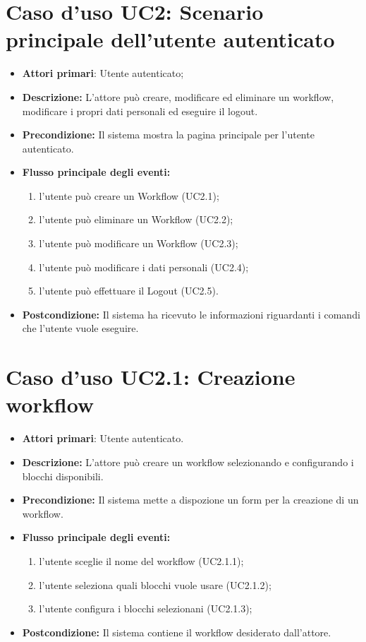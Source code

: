 {{{\section{Caso d'uso UC2: Scenario principale dell'utente autenticato}
\begin{itemize}
	\item \textbf{Attori primari}: Utente autenticato;
	\item \textbf{Descrizione:} L'attore può creare, modificare ed eliminare un workflow, modificare i propri dati personali ed eseguire il logout.
	\item \textbf{Precondizione:} Il sistema mostra la pagina principale per l'utente autenticato.
	\item \textbf{Flusso principale degli eventi:}
	\begin{enumerate}
		\item l'utente può creare un Workflow (UC2.1);
		\item l'utente può eliminare un Workflow (UC2.2);
		\item l'utente può modificare un Workflow (UC2.3);
		\item l'utente può modificare i dati personali (UC2.4);
		\item l'utente può effettuare il Logout (UC2.5).
	\end{enumerate}
	\item \textbf{Postcondizione:} Il sistema ha ricevuto le informazioni riguardanti i comandi che l'utente vuole eseguire.
\end{itemize}
\section{Caso d'uso UC2.1: Creazione workflow}
\begin{itemize}
	\item \textbf{Attori primari}: Utente autenticato.
	\item \textbf{Descrizione:} L'attore può creare un workflow selezionando e configurando i blocchi disponibili.
	\item \textbf{Precondizione:} Il sistema mette a dispozione un form per la creazione di un workflow.
	\item \textbf{Flusso principale degli eventi:}
	\begin{enumerate}
		\item l'utente sceglie il nome del workflow (UC2.1.1);
		\item l'utente seleziona quali blocchi vuole usare (UC2.1.2);
		\item l'utente configura i blocchi selezionani (UC2.1.3);
	\end{enumerate}
	\item \textbf{Postcondizione:} Il sistema contiene il workflow desiderato dall'attore.
\end{itemize}
}}}
